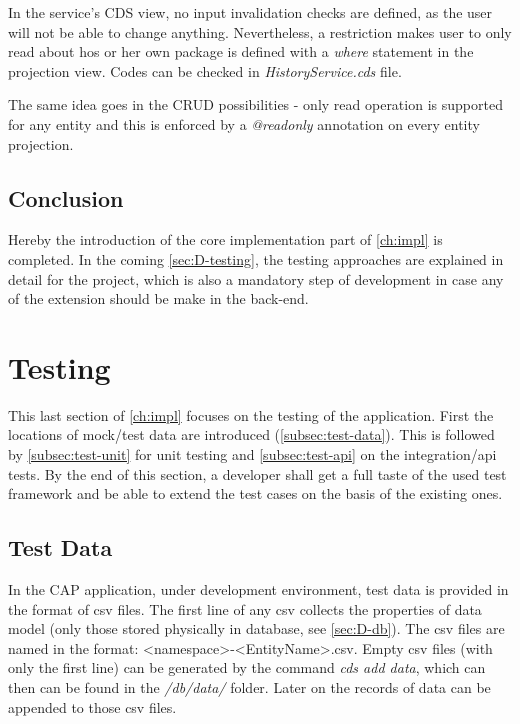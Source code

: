 \bigskip
In the service's CDS view, no input invalidation checks are defined, as the user will not be able to change anything. Nevertheless, a restriction makes user to only read about hos or her own package is defined with a \textit{where} statement in the projection view. Codes can be checked in \textit{HistoryService.cds} file.

\bigskip
The same idea goes in the CRUD possibilities - only read operation is supported for any entity and this is enforced by a \textit{@readonly} annotation on every entity projection.

\subsection*{Conclusion}
Hereby the introduction of the core implementation part of \autoref{ch:impl} is completed.
In the coming \autoref{sec:D-testing}, the testing approaches are explained in detail for the project, which is also a mandatory step of development in case any of the extension should be make in the back-end.

\section{Testing}
\label{sec:D-testing}

This last section of \autoref{ch:impl} focuses on the testing of the application. First the locations of mock/test data are introduced (\autoref{subsec:test-data}). This is followed by \autoref{subsec:test-unit} for unit testing and \autoref{subsec:test-api} on the integration/api tests. By the end of this section, a developer shall get a full taste of the used test framework and be able to extend the test cases on the basis of the existing ones.

\subsection{Test Data}
\label{subsec:test-data}
In the CAP application, under development environment, test data is provided in the format of csv \cite{csv} files. The first line of any csv collects the properties of data model (only those stored physically in database, see \autoref{sec:D-db}). The csv files are named in the format: <namespace>-<EntityName>.csv. Empty csv files (with only the first line) can be generated by the command \textit{cds add data}, which can then can be found in the \textit{/db/data/} folder. Later on the records of data can be appended to those csv files.

